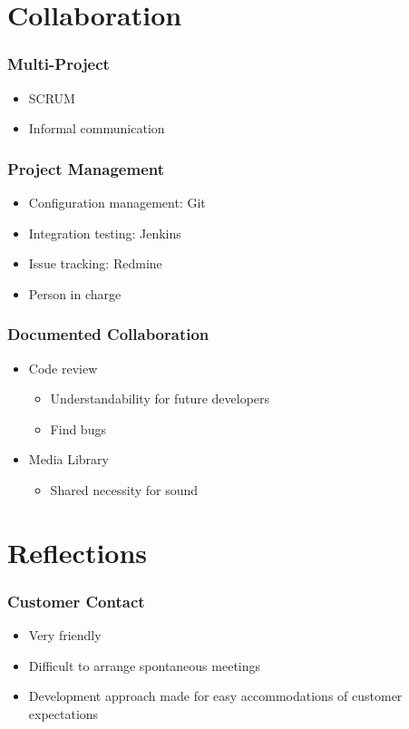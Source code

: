 	\section{Collaboration}
		\begin{frame}
			\frametitle{Multi-Project}
			\begin{itemize}
				\item SCRUM
				\item Informal communication
			\end{itemize}
		\end{frame}
		
		\begin{frame}
			\frametitle{Project Management}
			\begin{itemize}
				\item Configuration management: Git
				\item Integration testing: Jenkins
				\item Issue tracking: Redmine
				\item Person in charge
			\end{itemize}
		\end{frame}
		
		\begin{frame}
			\frametitle{Documented Collaboration}
			\begin{itemize}
				\item Code review
				\begin{itemize}
					\item Understandability for future developers
					\item Find bugs
				\end{itemize}
				\item Media Library
					\begin{itemize}
					\item Shared necessity for sound
					\end{itemize}
			\end{itemize}
		\end{frame}
		
		
	\section{Reflections}
		
		\begin{frame}
			\frametitle{Customer Contact}
			\begin{itemize}
				\item Very friendly
				\item Difficult to arrange spontaneous meetings
				\item Development approach made for easy accommodations of customer expectations
			\end{itemize}
		\end{frame}
		
